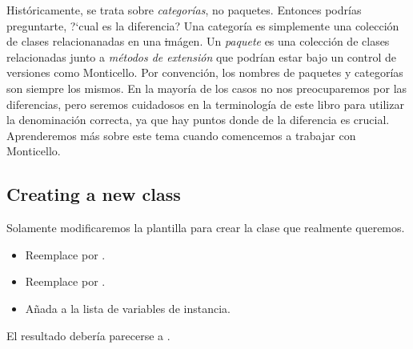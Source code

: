 \documentclass[a4paper,10pt,twoside]{book}
\begin{document}

Hist\'oricamente, se trata sobre \emph{categor\'ias}, no paquetes.
Entonces podr\'ias preguntarte, ?`cual es la diferencia?
Una categor\'ia es simplemente una colecci\'on de clases relacionanadas en
una \st im\'agen.
Un \emph{paquete} es una colecci\'on de clases relacionadas junto a
\emph{m\'etodos de extensi\'on} que podr\'ian estar bajo un control de versiones
como Monticello.
Por convenci\'on, los nombres de paquetes y categor\'ias son siempre los mismos.
En la mayor\'ia de los casos no nos preocuparemos por las diferencias, pero
seremos cuidadosos en la terminolog\'ia de este libro para utilizar la
denominaci\'on correcta, ya que hay puntos donde de la diferencia es crucial.
Aprenderemos m\'as sobre este tema cuando comencemos a trabajar con Monticello.


\subsection{Creating a new class}

Solamente modificaremos la plantilla para crear la clase que realmente queremos.

\begin{itemize}
  \item Reemplace  por .
  \item Reemplace  por .
  \item Añada  a la lista de variables de instancia.
\end{itemize}
El resultado deber\'ia parecerse a .
\end{document}
